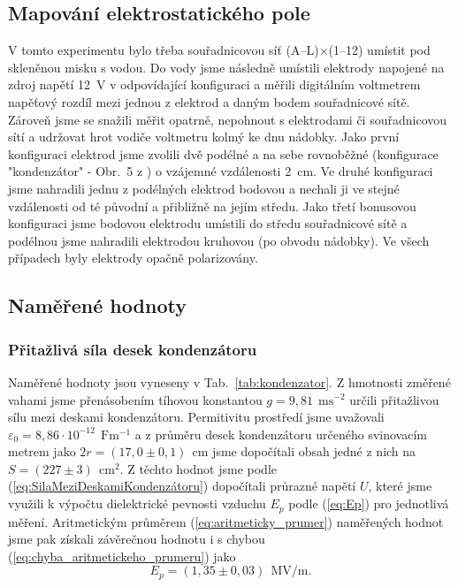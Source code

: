 \documentclass[english]{article}
\newcommand{\unit}[1]{\ \mathrm{#1}}
\begin{document}
		\subsection{Mapování elektrostatického pole}
				V tomto experimentu bylo třeba souřadnicovou síť (A--L)$\times$(1--12) umístit pod skleněnou misku s vodou. Do vody jsme následně umístili elektrody napojené na zdroj napětí 12~V v odpovídající konfiguraci a měřili digitálním voltmetrem napěťový rozdíl mezi jednou z elektrod a daným bodem souřadnicové sítě. Zároveň jsme se snažili měřit opatrně, nepohnout s elektrodami či souřadnicovou sítí a udržovat hrot vodiče voltmetru kolmý ke dnu nádobky. Jako první konfiguraci elektrod jsme zvolili dvě podélné a na sebe rovnoběžné (konfigurace "kondenzátor" - Obr.~5 z \cite{bib:zadani}) o vzájemné vzdálenosti 2~cm. Ve druhé konfiguraci jsme nahradili jednu z podélných elektrod bodovou a nechali ji ve stejné vzdálenosti od té původní a přibližně na jejím středu. Jako třetí bonusovou konfiguraci jsme bodovou elektrodu umístili do středu souřadnicové sítě a podélnou jsme nahradili elektrodou kruhovou (po obvodu nádobky). Ve všech případech byly elektrody opačně polarizovány. 

		\subsection{Naměřené hodnoty}
				\subsubsection{Přitažlivá síla desek kondenzátoru}
						Naměřené hodnoty jsou vyneseny v Tab.~\ref{tab:kondenzator}. Z hmotnosti změřené vahami jsme přenásobením tíhovou konstantou $g=9,81~\unit{ms^{-2}}$ určili přitažlivou sílu mezi deskami kondenzátoru. Permitivitu prostředí jsme uvažovali $\varepsilon_0=8,86\cdot 10^{-12}~\unit{Fm^{-1}}$ a z průměru desek kondenzátoru určeného svinovacím metrem jako $2r=(17,0\pm 0,1)~\unit{cm}$ jsme dopočítali obsah jedné z nich na $S=(227\pm 3)~\unit{cm^2}$. Z těchto hodnot jsme podle (\ref{eq:SilaMeziDeskamiKondenzátoru}) dopočítali průrazné napětí $U$, které jsme využili k výpočtu dielektrické pevnosti vzduchu $E_p$ podle (\ref{eq:Ep}) pro jednotlivá měření. Aritmetickým průměrem (\ref{eq:aritmeticky_prumer}) naměřených hodnot jsme pak získali závěrečnou hodnotu i s chybou (\ref{eq:chyba_aritmetickeho_prumeru}) jako
						\begin{equation}
								E_p = (1,35\pm 0,03)~\unit{MV/m}.
						\end{equation}
				
\end{document}
